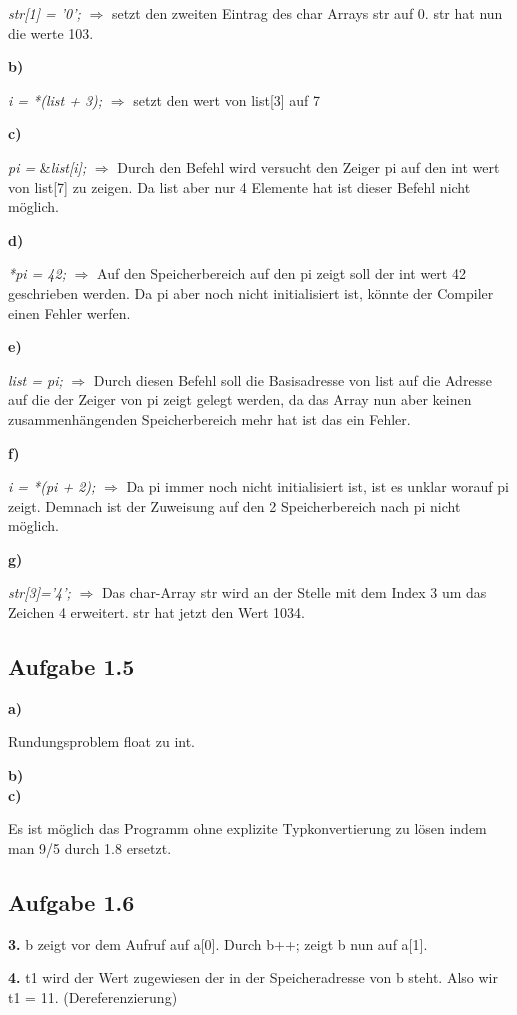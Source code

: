 \documentclass[a4paper,graphics,11pt]{article}
\newcommand{\aufgabe}[1]{\subsection*{Aufgabe #1}}
\begin{document}
\textit{str[1] = ’0’;} $\Longrightarrow$ setzt den zweiten Eintrag des char Arrays str auf 0. str hat nun die werte 103.

\textbf{b)}

\textit{i = *(list + 3);} $\Longrightarrow$ setzt den wert von list[3] auf 7

\textbf{c)}

\textit{pi =  } \&\textit{list[i];} $\Longrightarrow$ Durch den Befehl wird versucht den Zeiger pi auf den int wert von list[7] zu zeigen. Da list aber nur 4 Elemente hat ist dieser Befehl nicht möglich.

\textbf{d)}

\textit{*pi = 42;} $\Longrightarrow$ Auf den Speicherbereich auf den pi zeigt soll der int wert 42 geschrieben werden. Da pi aber noch nicht initialisiert ist, könnte der Compiler einen Fehler werfen.

\textbf{e)}

\textit{list = pi;} $\Longrightarrow$ Durch diesen Befehl soll die Basisadresse von list auf die Adresse auf die der Zeiger von pi zeigt gelegt werden, da das Array nun aber keinen zusammenhängenden Speicherbereich mehr hat ist das ein Fehler.

\textbf{f)}

\textit{i = *(pi + 2);} $\Longrightarrow$ Da pi immer noch nicht initialisiert ist, ist es unklar worauf pi zeigt. Demnach ist der Zuweisung auf den 2 Speicherbereich nach pi nicht möglich.

\textbf{g)}

\textit{str[3]=’4’;} $\Longrightarrow$ Das char-Array str wird an der Stelle mit dem Index 3 um das Zeichen 4 erweitert. str hat jetzt den Wert 1034.

\newpage

\aufgabe{1.5}

\textbf{a)}

Rundungsproblem float zu int.

\textbf{b)}\\



\textbf{c)}

Es ist möglich das Programm ohne explizite Typkonvertierung zu lösen indem man 9/5 durch 1.8 ersetzt.

\aufgabe{1.6}

\textbf{3.} b zeigt vor dem Aufruf auf a[0]. Durch b++; zeigt b nun auf a[1].

\textbf{4.} t1 wird der Wert zugewiesen der in der Speicheradresse von b steht. Also wir t1 = 11. (Dereferenzierung)
\end{document}

